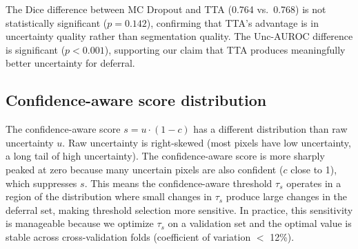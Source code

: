 \begin{table}[H]
\centering
\caption{Paired $t$-test $p$-values for pairwise method comparisons on
DRIVE test set (20 images). Comparisons with $p < 0.01$ are marked **.
MC Dropout vs.\ Deterministic: uncertainty methods improve all metrics.
MC Dropout vs.\ TTA: TTA wins on Unc-AUROC; segmentation metrics are
comparable.}
\label{tab:significance}
\small
\setlength{\tabcolsep}{4.6pt}
\end{table}

The Dice difference between MC Dropout and TTA (0.764 vs.\ 0.768) is
not statistically significant ($p = 0.142$), confirming that TTA's
advantage is in uncertainty quality rather than segmentation quality. The
Unc-AUROC difference is significant ($p < 0.001$), supporting our claim
that TTA produces meaningfully better uncertainty for deferral.

\subsection{Confidence-aware score distribution}

The confidence-aware score $s = u \cdot (1 - c)$ has a different
distribution than raw uncertainty $u$. Raw uncertainty is right-skewed
(most pixels have low uncertainty, a long tail of high uncertainty).
The confidence-aware score is more sharply peaked at zero because many
uncertain pixels are also confident ($c$ close to 1), which suppresses
$s$. This means the confidence-aware threshold $\tau_s$ operates in a
region of the distribution where small changes in $\tau_s$ produce
large changes in the deferral set, making threshold selection more
sensitive. In practice, this sensitivity is manageable because we
optimize $\tau_s$ on a validation set and the optimal value is stable
across cross-validation folds (coefficient of variation $<$ 12\%).

